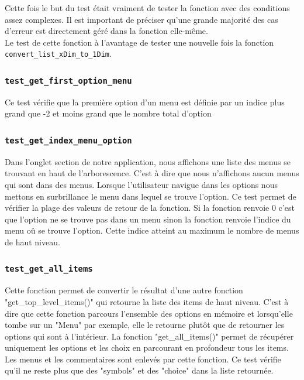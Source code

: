\documentclass[16pts]{report}
\begin{document}
Cette fois le but du test était vraiment de tester la fonction avec des 
conditions assez complexes. Il est important de préciser qu'une grande 
majorité des cas d'erreur est directement géré dans la fonction elle-même.\\

Le test de cette fonction à l'avantage de tester une nouvelle fois la 
fonction \verb|convert_list_xDim_to_1Dim|.

\subsubsection{\texttt{test\_get\_first\_option\_menu}}

Ce test vérifie que la première option d'un menu est définie par un indice
plus grand que -2 et moins grand que le nombre total d'option

\subsubsection{\texttt{test\_get\_index\_menu\_option}}

Dans l'onglet section de notre application, nous affichons une liste des 
menus se trouvant en haut de l'arborescence. C'est à dire que nous n'affichons 
aucun menus qui sont dans des menus. Lorsque l'utilisateur navigue dans les 
options nous mettons en surbrillance le menu dans lequel se trouve l'option. 
Ce test permet de vérifier la plage des valeurs de retour de la fonction. 
Si la fonction renvoie 0 c'est que l'option ne se trouve pas dans un menu 
sinon la fonction renvoie l'indice du menu oû se trouve l'option. Cette 
indice atteint au maximum le nombre de menus de haut niveau.

\subsubsection{\texttt{test\_get\_all\_items}}

Cette fonction permet de convertir le résultat d'une autre fonction 
"get\_top\_level\_items()" qui retourne la liste des items de haut niveau. 
C'est à dire que cette fonction parcours l'ensemble des options en mémoire 
et lorsqu'elle tombe sur un "Menu" par exemple, elle le retourne plutôt que 
de retourner les options qui sont à l'intérieur. La fonction 
"get\_all\_items()" permet de récupérer uniquement les options et les choix 
en parcourant en profondeur tous les items. Les menus et les commentaires 
sont enlevés par cette fonction. Ce test vérifie qu'il ne reste plus que 
des "symbols" et des "choice" dans la liste retournée.
\end{document}
